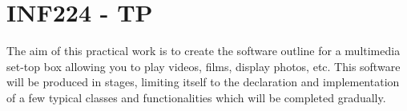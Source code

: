 \chapter{INF224 -\/ TP}
\hypertarget{md_cpp_2_r_e_a_d_m_e}{}\label{md_cpp_2_r_e_a_d_m_e}
\label{md_cpp_2_r_e_a_d_m_e_autotoc_md0}%
%
The aim of this practical work is to create the software outline for a multimedia set-\/top box allowing you to play videos, films, display photos, etc. This software will be produced in stages, limiting itself to the declaration and implementation of a few typical classes and functionalities which will be completed gradually. 